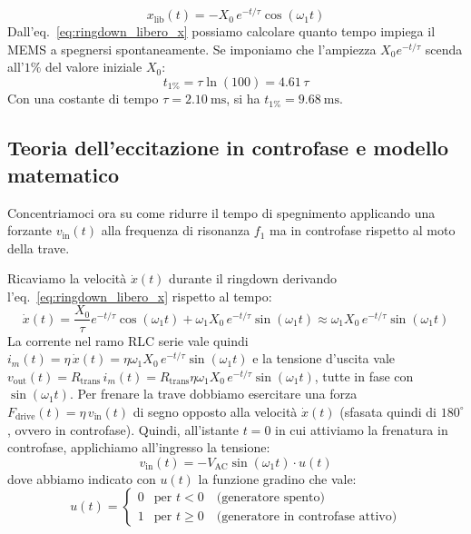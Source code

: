 \documentclass[11pt,a4paper]{article}
\begin{document}
\begin{equation}
    \label{eq:ringdown_libero_x}
    x_{\text{lib}}(t) = -X_0 \, e^{-t/\tau} \cos(\omega_1 t)
\end{equation}
Dall'eq.~\eqref{eq:ringdown_libero_x} possiamo calcolare quanto tempo impiega il MEMS a spegnersi spontaneamente. Se imponiamo che l'ampiezza $X_0 e^{-t/\tau}$ scenda all'$1\%$ del valore iniziale $X_0$:
\begin{equation}
    t_{1\%} = \tau \ln(100) = 4.61 \, \tau
\end{equation}
Con una costante di tempo $\tau = \SI{2.10}{\milli\second}$, si ha $t_{1\%} = \SI{9.68}{\milli\second}$.

\subsection{Teoria dell'eccitazione in controfase e modello matematico}
\label{subsec:teoria_controfase_unificata}

Concentriamoci ora su come ridurre il tempo di spegnimento applicando una forzante $v_{\text{in}}(t)$ alla frequenza di risonanza $f_1$ ma in controfase rispetto al moto della trave.

\vspace{0.3cm}
\noindent Ricaviamo la velocità $\dot{x}(t)$ durante il ringdown derivando l'eq.~\eqref{eq:ringdown_libero_x} rispetto al tempo:
\begin{equation}
    \label{eq:velocita_ringdown}
    \dot{x}(t) = \frac{X_0}{\tau} e^{-t/\tau} \cos(\omega_1 t) + \omega_1 X_0 \, e^{-t/\tau} \sin(\omega_1 t) \approx \omega_1 X_0 \, e^{-t/\tau} \sin(\omega_1 t)
\end{equation}
La corrente nel ramo RLC serie vale quindi $i_m(t) = \eta \, \dot{x}(t) = \eta \omega_1 X_0 \, e^{-t/\tau} \sin(\omega_1 t)$ e la tensione d'uscita vale $v_{\text{out}}(t) = R_{\text{trans}} \, i_m(t) = R_{\text{trans}} \eta \omega_1 X_0 \, e^{-t/\tau} \sin(\omega_1 t)$, tutte in fase con $\sin(\omega_1 t)$. Per frenare la trave dobbiamo esercitare una forza $F_{\text{drive}}(t) = \eta \, v_{\text{in}}(t)$ di segno opposto alla velocità $\dot{x}(t)$ (sfasata quindi di $180^\circ$, ovvero in controfase). Quindi, all'istante $t = 0$ in cui attiviamo la frenatura in controfase, applichiamo all'ingresso la tensione:
\begin{equation}
    \label{eq:vin_controfase_gradino}
    v_{\text{in}}(t) = -V_{\text{AC}} \sin(\omega_1 t) \cdot u(t)
\end{equation}
dove abbiamo indicato con $u(t)$ la funzione gradino che vale:
\begin{equation}
    u(t) = \begin{cases} 0 & \text{per } t < 0 \quad \text{(generatore spento)} \\ 1 & \text{per } t \ge 0 \quad \text{(generatore in controfase attivo)} \end{cases}
\end{equation}
\end{document}
